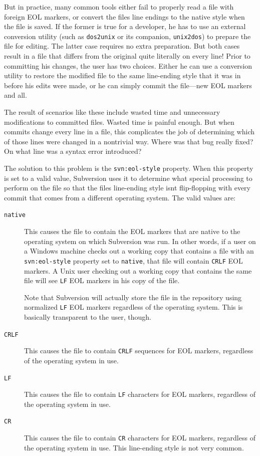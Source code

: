 But in practice, many common tools either fail to properly read a file
with foreign EOL markers, or convert the file\textquotesingle s line
endings to the native style when the file is saved. If the former is
true for a developer, he has to use an external conversion utility (such
as \texttt{dos2unix} or its companion, \texttt{unix2dos}) to prepare the
file for editing. The latter case requires no extra preparation. But
both cases result in a file that differs from the original quite
literally on every line! Prior to committing his changes, the user has
two choices. Either he can use a conversion utility to restore the
modified file to the same line-ending style that it was in before his
edits were made, or he can simply commit the file---new EOL markers and
all.

The result of scenarios like these include wasted time and unnecessary
modifications to committed files. Wasted time is painful enough. But
when commits change every line in a file, this complicates the job of
determining which of those lines were changed in a nontrivial way. Where
was that bug really fixed? On what line was a syntax error introduced?

The solution to this problem is the \texttt{svn:eol-style} property.
When this property is set to a valid value, Subversion uses it to
determine what special processing to perform on the file so that the
file\textquotesingle s line-ending style isn\textquotesingle t
flip-flopping with every commit that comes from a different operating
system. The valid values are:

\begin{description}
\item[\texttt{native}]
This causes the file to contain the EOL markers that are native to the
operating system on which Subversion was run. In other words, if a user
on a Windows machine checks out a working copy that contains a file with
an \texttt{svn:eol-style} property set to \texttt{native}, that file
will contain \texttt{CRLF} EOL markers. A Unix user checking out a
working copy that contains the same file will see \texttt{LF} EOL
markers in his copy of the file.

Note that Subversion will actually store the file in the repository
using normalized \texttt{LF} EOL markers regardless of the operating
system. This is basically transparent to the user, though.
\item[\texttt{CRLF}]
This causes the file to contain \texttt{CRLF} sequences for EOL markers,
regardless of the operating system in use.
\item[\texttt{LF}]
This causes the file to contain \texttt{LF} characters for EOL markers,
regardless of the operating system in use.
\item[\texttt{CR}]
This causes the file to contain \texttt{CR} characters for EOL markers,
regardless of the operating system in use. This line-ending style is not
very common.
\end{description}

